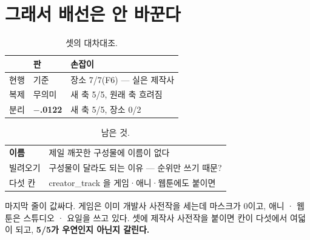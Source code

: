 \documentclass[10pt]{article}
\begin{document}

\section{그래서 배선은 안 바꾼다}

\begin{table}[t]
\centering\tsize
\caption{셋의 대차대조.}
\begin{tabular}{lll}
\toprule
& 판 & 손잡이 \\
\midrule
현행 & 기준 & 장소 7/7(F6) --- 실은 제작사 \\
복제 & 무의미 & 새 축 5/5, 원래 축 흐려짐 \\
분리 & \textbf{$-$.0122} & 새 축 5/5, 장소 0/2 \\
\bottomrule
\end{tabular}
\end{table}


\begin{table}[t]
\centering\tsize
\caption{남은 것.}
\begin{tabular}{ll}
\toprule
\textbf{이름} & 제일 깨끗한 구성물에 이름이 없다 \\
빌려오기 & 구성물이 달라도 되는 이유 --- 순위만 쓰기 때문? \\
다섯 칸 & creator\_track 을 게임·애니·웹툰에도 붙이면 \\
\bottomrule
\end{tabular}
\end{table}

마지막 줄이 값싸다. 게임은 이미 개발사 사전작을 세는데 마스크가 0이고,
애니 · 웹툰은 스튜디오 · 요일을 쓰고 있다. 셋에 제작사 사전작을 붙이면
칸이 다섯에서 여덟이 되고, \textbf{5/5가 우연인지 아닌지 갈린다.}
\end{document}
